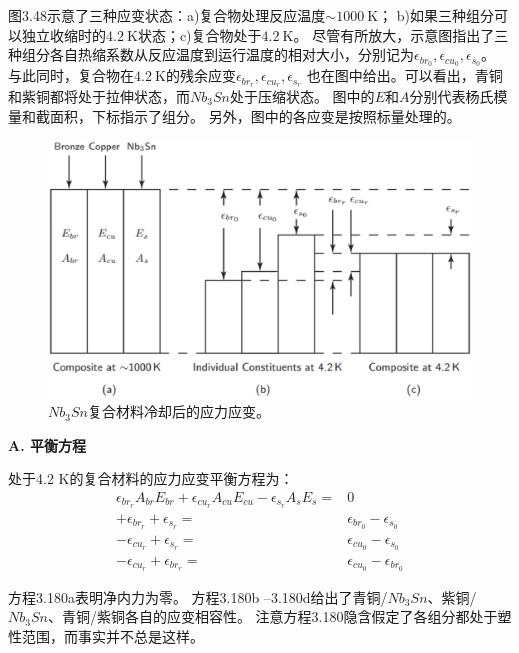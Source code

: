 图3.48示意了三种应变状态：a)复合物处理反应温度$\sim 1000\ \mathrm{K}$；
b)如果三种组分可以独立收缩时的$4.2\ \mathrm{K}$状态；c)复合物处于$4.2\ \mathrm{K}$。
尽管有所放大，示意图指出了三种组分各自热缩系数从反应温度到运行温度的相对大小，分别记为$\epsilon_{br_0},\epsilon_{cu_0}, \epsilon_{s_0}$。
与此同时，复合物在$4.2\ \mathrm{K}$的残余应变$\epsilon_{br_r},\epsilon_{cu_r}, \epsilon_{s_r}$
也在图中给出。可以看出，青铜和紫铜都将处于拉伸状态，而$Nb_3Sn$处于压缩状态。
图中的$E$和$A$分别代表杨氏模量和截面积，下标指示了组分。
另外，图中的各应变是按照标量处理的。
\begin{figure}[htbp]
	\centering
	\includegraphics[scale=0.5]{chpt3/figs/fig3.48.eps}
	\caption{$Nb_3Sn$复合材料冷却后的应力应变。}
\end{figure}

\textbf{A. 平衡方程}

处于4.2 K的复合材料的应力应变平衡方程为：
\begin{subequations}%
	\begin{align}
\epsilon_{br_r}A_{br}E_{br}+\epsilon_{cu_r}A_{cu}E_{cu}-\epsilon_{s_r}A_sE_s=&0\\
+\epsilon_{br_r}+\epsilon_{s_r}=&\epsilon_{br_0}-\epsilon_{s_0}\\
-\epsilon_{cu_r}+\epsilon_{s_r}=&\epsilon_{cu_0}-\epsilon_{s_0}\\
-\epsilon_{cu_r}+\epsilon_{br_r}=&\epsilon_{cu_0}-\epsilon_{br_0}
	\end{align}
\end{subequations}

方程3.180a表明净内力为零。
方程3.180b –3.180d给出了青铜/$Nb_3Sn$、紫铜/$Nb_3Sn$、青铜/紫铜各自的应变相容性。
注意方程3.180隐含假定了各组分都处于塑性范围，而事实并不总是这样。

